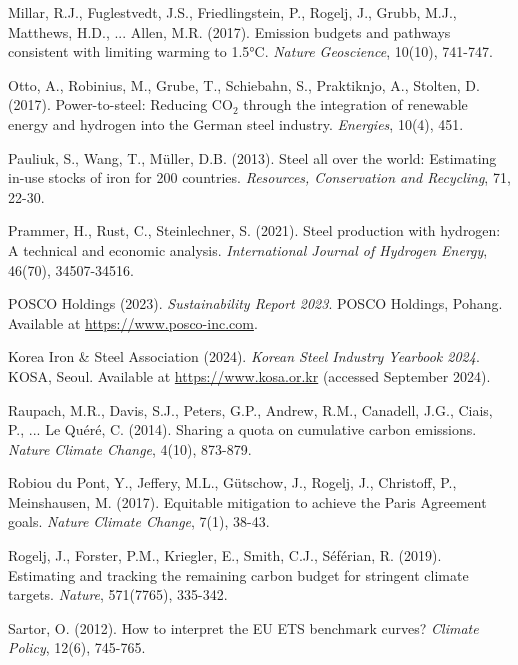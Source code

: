 \documentclass[preprint,1p,authoryear]{elsarticle}
\begin{document}
\begin{thebibliography}{99}
 Millar, R.J., Fuglestvedt, J.S., Friedlingstein, P., Rogelj, J., Grubb, M.J., Matthews, H.D., ... Allen, M.R. (2017). Emission budgets and pathways consistent with limiting warming to 1.5°C. \textit{Nature Geoscience}, 10(10), 741-747.

 Otto, A., Robinius, M., Grube, T., Schiebahn, S., Praktiknjo, A., Stolten, D. (2017). Power-to-steel: Reducing CO$_2$ through the integration of renewable energy and hydrogen into the German steel industry. \textit{Energies}, 10(4), 451.

 Pauliuk, S., Wang, T., Müller, D.B. (2013). Steel all over the world: Estimating in-use stocks of iron for 200 countries. \textit{Resources, Conservation and Recycling}, 71, 22-30.

 Prammer, H., Rust, C., Steinlechner, S. (2021). Steel production with hydrogen: A technical and economic analysis. \textit{International Journal of Hydrogen Energy}, 46(70), 34507-34516.

 POSCO Holdings (2023). \textit{Sustainability Report 2023}. POSCO Holdings, Pohang. Available at \url{https://www.posco-inc.com}.

 Korea Iron \& Steel Association (2024). \textit{Korean Steel Industry Yearbook 2024}. KOSA, Seoul. Available at \url{https://www.kosa.or.kr} (accessed September 2024).

 Raupach, M.R., Davis, S.J., Peters, G.P., Andrew, R.M., Canadell, J.G., Ciais, P., ... Le Quéré, C. (2014). Sharing a quota on cumulative carbon emissions. \textit{Nature Climate Change}, 4(10), 873-879.

 Robiou du Pont, Y., Jeffery, M.L., Gütschow, J., Rogelj, J., Christoff, P., Meinshausen, M. (2017). Equitable mitigation to achieve the Paris Agreement goals. \textit{Nature Climate Change}, 7(1), 38-43.

 Rogelj, J., Forster, P.M., Kriegler, E., Smith, C.J., Séférian, R. (2019). Estimating and tracking the remaining carbon budget for stringent climate targets. \textit{Nature}, 571(7765), 335-342.

 Sartor, O. (2012). How to interpret the EU ETS benchmark curves? \textit{Climate Policy}, 12(6), 745-765.


\end{thebibliography}
\end{document}
